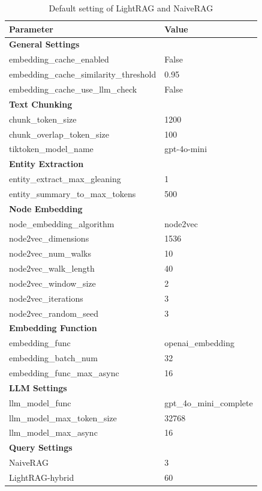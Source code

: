 \begin{table}[!htbp]
\centering
\caption{Default setting of LightRAG and NaiveRAG}
\label{tbl:default_para_lightrag}
\small
\def\arraystretch{1.2}
\setlength{\tabcolsep}{3pt}
\begin{tabular}{ll}
\toprule
\textbf{Parameter} & \textbf{Value} \\ \hline
\multicolumn{2}{l}{\textbf{General Settings}} \\ \hline
embedding\_cache\_enabled & False \\
embedding\_cache\_similarity\_threshold & 0.95 \\
embedding\_cache\_use\_llm\_check & False \\
\multicolumn{2}{l}{\textbf{Text Chunking}} \\ \hline
chunk\_token\_size & 1200 \\
chunk\_overlap\_token\_size & 100 \\
tiktoken\_model\_name & gpt-4o-mini \\ \hline
\multicolumn{2}{l}{\textbf{Entity Extraction}} \\ \hline
entity\_extract\_max\_gleaning & 1 \\
entity\_summary\_to\_max\_tokens & 500 \\ \hline
\multicolumn{2}{l}{\textbf{Node Embedding}} \\ \hline
node\_embedding\_algorithm & node2vec \\
node2vec\_dimensions & 1536 \\
node2vec\_num\_walks & 10 \\
node2vec\_walk\_length & 40 \\
node2vec\_window\_size & 2 \\
node2vec\_iterations & 3 \\
node2vec\_random\_seed & 3 \\ \hline
\multicolumn{2}{l}{\textbf{Embedding Function}} \\ \hline
embedding\_func & openai\_embedding \\
embedding\_batch\_num & 32 \\
embedding\_func\_max\_async & 16 \\ \hline
\multicolumn{2}{l}{\textbf{LLM Settings}} \\ \hline
llm\_model\_func & gpt\_4o\_mini\_complete \\
llm\_model\_max\_token\_size & 32768 \\
llm\_model\_max\_async & 16 \\\hline
\multicolumn{2}{l}{\textbf{Query Settings}} \\ \hline
NaiveRAG & 3 \\
LightRAG-hybrid & 60 \\
\bottomrule
\end{tabular}
\end{table}




